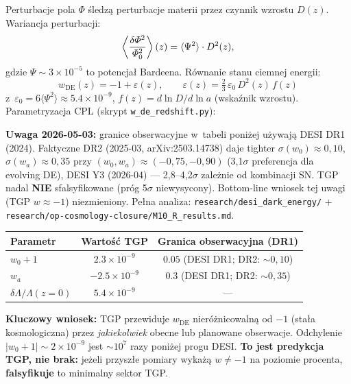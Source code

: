 \begin{remark}\label{rem:wz-quantitative}
Perturbacje pola $\Phi$ \'sledz\k{a} perturbacje materii
przez czynnik wzrostu $D(z)$. Wariancja perturbacji:
\begin{equation}\label{eq:delta-Phi-var}
  \left\langle\frac{\delta\varPhi^2}{\varPhi_0^2}\right\rangle(z)
  = \langle\Psi^2\rangle \cdot D^2(z),
\end{equation}
gdzie $\Psi \sim 3\times 10^{-5}$ to potencja\l{} Bardeena.
R\'ownanie stanu ciemnej energii:
\begin{equation}\label{eq:w-de-tgp}
  \boxed{
    w_{\mathrm{DE}}(z) = -1 + \varepsilon(z), \qquad
    \varepsilon(z) = \tfrac{2}{3}\,\varepsilon_0\,D^2(z)\,f(z)
  }
\end{equation}
z~$\varepsilon_0 = 6\langle\Psi^2\rangle \approx 5.4\times 10^{-9}$,
$f(z) = d\ln D/d\ln a$ (wska\'znik wzrostu).
Parametryzacja CPL (skrypt \texttt{w\_de\_redshift.py}):

\medskip\noindent
\textbf{Uwaga 2026-05-03:} granice obserwacyjne w~tabeli poni\.zej u\.zywaj\k{a}
DESI DR1 (2024). Faktyczne DR2 (2025-03, arXiv:2503.14738) daje tighter
$\sigma(w_0) \approx 0{,}10$, $\sigma(w_a) \approx 0{,}35$ przy
$(w_0, w_a) \approx (-0{,}75, -0{,}90)$ (3{,}1$\sigma$ preferencja dla
evolving DE), DESI Y3 (2026-04) --- 2{,}8--4{,}2$\sigma$ zale\.znie od
kombinacji SN. TGP nadal \textbf{NIE} sfalsyfikowane (próg 5$\sigma$
niewysycony). Bottom-line wniosek tej uwagi (TGP $w \approx -1$) niezmieniony.
Pe\l{}na analiza: \texttt{research/desi\_dark\_energy/} +
\texttt{research/op-cosmology-closure/M10\_R\_results.md}.

\begin{center}
\begin{tabular}{lcc}
\toprule
  Parametr & Warto\'s\'c TGP & Granica obserwacyjna (DR1) \\
\midrule
  $w_0 + 1$ & $2.3 \times 10^{-9}$ & $0.05$ (DESI DR1; DR2: $\sim 0{,}10$) \\
  $w_a$ & $-2.5 \times 10^{-9}$ & $0.3$ (DESI DR1; DR2: $\sim 0{,}35$) \\
  $\delta\Lambda/\Lambda(z{=}0)$ & $5.4 \times 10^{-9}$ & --- \\
\bottomrule
\end{tabular}
\end{center}
\textbf{Kluczowy wniosek:} TGP przewiduje $w_{\mathrm{DE}}$
nier\'o\.znicowaln\k{a} od $-1$ (sta\l{}a kosmologiczna) przez
\emph{jakiekolwiek} obecne lub planowane obserwacje.
Odchylenie $|w_0+1| \sim 2\times 10^{-9}$ jest $\sim 10^{7}$
razy poni\.zej progu DESI.
\textbf{To jest predykcja TGP, nie brak:} je\.zeli przysz\l{}e
pomiary wyka\.z\k{a} $w \neq -1$ na poziomie procenta,
\textbf{falsyfikuje} to minimalny sektor TGP.


\end{remark}
